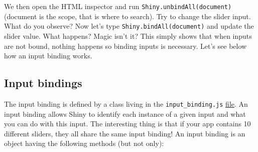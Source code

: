 \documentclass[]{book}
\newenvironment{Shaded}{\begin{snugshade}}{\end{snugshade}}
\newcommand{\ControlFlowTok}[1]{\textcolor[rgb]{0.13,0.29,0.53}{\textbf{#1}}}
\newcommand{\DataTypeTok}[1]{\textcolor[rgb]{0.13,0.29,0.53}{#1}}
\newcommand{\DecValTok}[1]{\textcolor[rgb]{0.00,0.00,0.81}{#1}}
\newcommand{\KeywordTok}[1]{\textcolor[rgb]{0.13,0.29,0.53}{\textbf{#1}}}
\newcommand{\NormalTok}[1]{#1}
\newcommand{\OperatorTok}[1]{\textcolor[rgb]{0.81,0.36,0.00}{\textbf{#1}}}
\newcommand{\StringTok}[1]{\textcolor[rgb]{0.31,0.60,0.02}{#1}}
\begin{document}
\begin{Shaded}
\end{Shaded}

We then open the HTML inspector and run \texttt{Shiny.unbindAll(document)} (document is the scope, that is where to search). Try to change the slider input. What do you observe? Now let's type \texttt{Shiny.bindAll(document)} and update the slider value. What happens? Magic isn't it? This simply shows that when inputs are not bound, nothing happens so binding inputs is necessary. Let's see below how an input binding works.

\hypertarget{input-bindings}{%
\subsection{Input bindings}\label{input-bindings}}

The input binding is defined by a class living in the \texttt{input\_binding.js} \href{https://github.com/rstudio/shiny/blob/master/srcjs/input_binding.js}{file}.
An input binding allows Shiny to identify each instance of a given input and what you can do with this input. The interesting thing is that if your app contains 10 different sliders, they all share the same input binding! An input binding is an object having the following methods (but not only):
\end{document}
